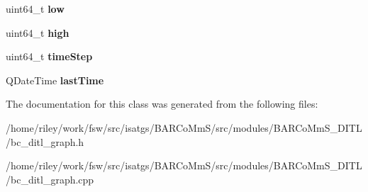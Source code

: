 \begin{DoxyCompactItemize}
\item 
uint64\+\_\+t {\bfseries low}\hypertarget{class_graph_acfd2a7064a6389a24811f45719066ea0}{}\label{class_graph_acfd2a7064a6389a24811f45719066ea0}

\item 
uint64\+\_\+t {\bfseries high}\hypertarget{class_graph_a1c1b271f69610bc76da4d5460d05b19d}{}\label{class_graph_a1c1b271f69610bc76da4d5460d05b19d}

\item 
uint64\+\_\+t {\bfseries time\+Step}\hypertarget{class_graph_aa4e40f6c15416b9df71b74ed7108e8ed}{}\label{class_graph_aa4e40f6c15416b9df71b74ed7108e8ed}

\item 
Q\+Date\+Time {\bfseries last\+Time}\hypertarget{class_graph_a7ea09f92c1d2bbd4238a091927b1a43d}{}\label{class_graph_a7ea09f92c1d2bbd4238a091927b1a43d}

\end{DoxyCompactItemize}


The documentation for this class was generated from the following files\+:\begin{DoxyCompactItemize}
\item 
/home/riley/work/fsw/src/isatgs/\+B\+A\+R\+Co\+Mm\+S/src/modules/\+B\+A\+R\+Co\+Mm\+S\+\_\+\+D\+I\+T\+L/bc\+\_\+ditl\+\_\+graph.\+h\item 
/home/riley/work/fsw/src/isatgs/\+B\+A\+R\+Co\+Mm\+S/src/modules/\+B\+A\+R\+Co\+Mm\+S\+\_\+\+D\+I\+T\+L/bc\+\_\+ditl\+\_\+graph.\+cpp\end{DoxyCompactItemize}
